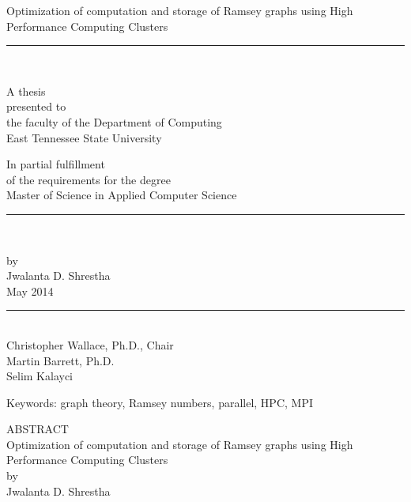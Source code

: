 \documentclass[12pt]{etsu_thesis}
\begin{document}
\thispagestyle{empty}


\begin{center}
{Optimization of computation and storage of Ramsey graphs using High Performance Computing Clusters \\
[.02in]} \rm
\rule{1.25in}{.005in}\\[.0 in]

\vspace{.15in}

A thesis \\ [.02in]
presented to \\ [.02in]
the faculty of the Department of Computing \\[.02in]
East Tennessee State University \\ [.02in]

\vspace{.15in}

In partial fulfillment \\[.02in]of the requirements for the degree \\
[.02in] Master of Science in Applied Computer Science \\ [.02in]
\rule{1.25in}{.005in}\\

\vspace{.15in}

by  \\ [.02in]
{ Jwalanta D. Shrestha } \\[.024in]
{May 2014} \\[.02in]
\rule{1.25in}{.005in}\\

\vspace{.15in}
Christopher Wallace, Ph.D., Chair \\[.02in]
Martin Barrett, Ph.D. \\[.02in]
Selim Kalayci \\[.02in]

\vspace{.15in}

Keywords: graph theory, Ramsey numbers, parallel, HPC, MPI


\end{center}
\newpage
\pagestyle{plain}
\begin{center}
{ ABSTRACT}\\
{ Optimization of computation and storage of Ramsey graphs using High Performance Computing Clusters \\ } by \\
[.1in]

{ Jwalanta D. Shrestha}\\[.1in]

\end{center}
\end{document}
